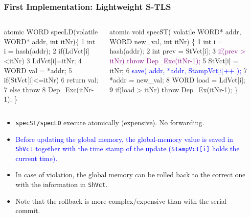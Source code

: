 \documentclass{beamer}
\newcommand{\blue}[1]{\textcolor{Blue}{{#1}}}
\newcommand{\purple}[1]{\textcolor{Purple}{{#1}}}
\newcommand{\emp}[1]{\textcolor{DikuRed}{ #1}}
\newcommand{\emphh}[1]{\textcolor{CosGreen}{ #1}}
\begin{document}
\begin{frame}[fragile,t]
  \frametitle{First Implementation: Lightweight S-TLS}

\begin{columns}
\begin{colorcode}
\emp{atomic} WORD \emphh{specLD}(volatile
      WORD* addr, int itNr)\{
1   int i = hash(addr);
2   \emphh{if(LdVct[i]<itNr)}
3      \emphh{LdVct[i]=itNr;}
4   WORD val = *addr;
5   if(StVct[i]<=itNr)
6      return val;
7   \emp{else throw}
8     \emp{Dep_Exc(itNr-1);}    \}
\end{colorcode}
\begin{colorcode}
\emp{atomic} void \emphh{specST}( volatile WORD* addr,
                    WORD new_val, int itNr) \{
1   int i    = hash(addr);
2   int prev = StVct[i];
3   \purple{if(prev > itNr) throw Dep_Exc(itNr-1);}
5   \emphh{StVct[i] = itNr;}
6   \blue{save( addr, *addr, StampVct[i]++ );}
7   *addr     = new_val;
8   WORD load = LdVct[i];
9   \alert{if(load > itNr) throw Dep_Ex(itNr-1);}  \}
\end{colorcode}
\end{columns}
\medskip\pause

\begin{itemize}
    \item {\tt specST/specLD} execute atomically (expensive). No forwarding.\medskip
    \item \blue{Before updating the global memory, the global-memory value is
                saved in {\tt ShVct} together with the time stamp of the update
                ({\tt StampVct[i]} holds the current time).}\medskip
    \item In case of violation, the global memory can be rolled back to 
            the correct one with the information in {\tt ShVct}.\medskip

    \item Note that the rollback is more complex/expensive than with the serial commit.
\end{itemize}

\end{frame}
\end{document}
